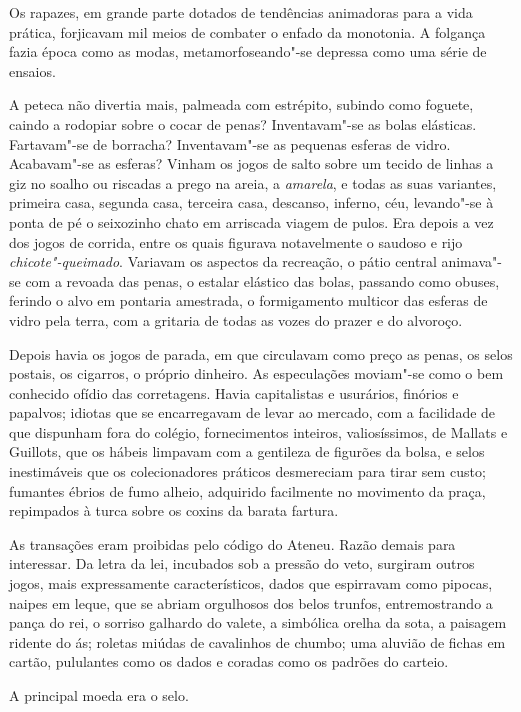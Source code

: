 Os rapazes, em grande parte dotados de tendências animadoras para a vida
prática, forjicavam mil meios de combater o enfado da monotonia. A
folgança fazia época como as modas, metamorfoseando"-se depressa como
uma série de ensaios. 

A peteca não divertia mais, palmeada com
estrépito, subindo como foguete, caindo a rodopiar sobre o cocar de
penas? Inventavam"-se as bolas elásticas. Fartavam"-se de borracha?
Inventavam"-se as pequenas esferas de vidro. Acabavam"-se as esferas?
Vinham os jogos de salto sobre um tecido de linhas a giz no soalho ou
riscadas a prego na areia, a \textit{amarela}, e todas as suas variantes,
primeira casa, segunda casa, terceira casa, descanso, inferno, céu,
levando"-se à ponta de pé o seixozinho chato em arriscada viagem de
pulos. Era depois a vez dos jogos de corrida, entre os quais figurava
notavelmente o saudoso e rijo \textit{chicote"-queimado}. Variavam os aspectos
da recreação, o pátio central animava"-se com a revoada das penas, o
estalar elástico das bolas, passando como obuses, ferindo o alvo em
pontaria amestrada, o formigamento multicor das esferas de vidro pela
terra, com a gritaria de todas as vozes do prazer e do alvoroço. 

Depois havia os jogos de parada, em que circulavam como preço as penas, os
selos postais, os cigarros, o próprio dinheiro. As especulações
moviam"-se como o bem conhecido ofídio das corretagens. Havia
capitalistas e usurários, finórios e papalvos; idiotas que se
encarregavam de levar ao mercado, com a facilidade de que dispunham
fora do colégio, fornecimentos inteiros, valiosíssimos, de Mallats e
Guillots, que os hábeis limpavam com a gentileza de figurões da bolsa,
e selos inestimáveis que os colecionadores práticos desmereciam para
tirar sem custo; fumantes ébrios de fumo alheio, adquirido facilmente
no movimento da praça, repimpados à turca sobre os coxins da barata
fartura. 

As transações eram proibidas pelo código do Ateneu. Razão
demais para interessar. Da letra da lei, incubados sob a pressão do
veto, surgiram outros jogos, mais expressamente característicos, dados
que espirravam como pipocas, naipes em leque, que se abriam orgulhosos
dos belos trunfos, entremostrando a pança do rei, o sorriso galhardo do
valete, a simbólica orelha da sota, a paisagem ridente do ás; roletas
miúdas de cavalinhos de chumbo; uma aluvião de fichas em cartão,
pululantes como os dados e coradas como os padrões do carteio. 

A principal moeda era o selo. 

